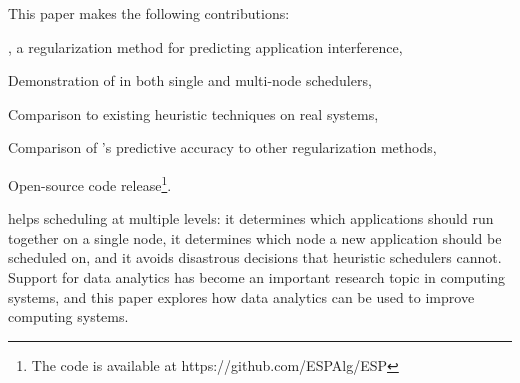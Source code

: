 This paper makes the following contributions:
\begin{inparaenum}[1)]
\item \SYSTEM{}, a regularization method for predicting application
  interference,
\item Demonstration of \SYSTEM{} in both single and multi-node
  schedulers,
\item Comparison to existing heuristic techniques on real systems,
\item Comparison of \SYSTEM{}'s predictive accuracy to other
  regularization methods,
\item Open-source code release\footnote{The code is available at
    https://github.com/ESPAlg/ESP}.
\end{inparaenum}
\SYSTEM{} helps scheduling at multiple levels: it determines which
applications should run together on a single node, it determines which
node a new application should be scheduled on, and it avoids
disastrous decisions that heuristic schedulers cannot.  Support for
data analytics has become an important research topic in computing
systems, and this paper explores how data analytics can be used to
improve computing systems.
